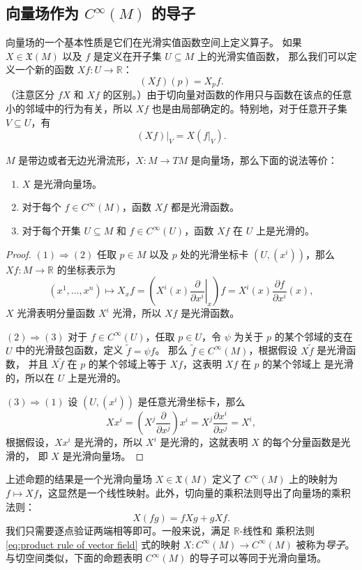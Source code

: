 \documentclass[fontset=none]{Notes}
\begin{document}
\subsection{向量场作为 $C^\infty(M)$ 的导子}

向量场的一个基本性质是它们在光滑实值函数空间上定义算子。
如果 $X\in \mathfrak X(M)$ 以及 $f$ 是定义在开子集 $U\subseteq M$ 上的光滑实值函数，
那么我们可以定义一个新的函数 $Xf:U\to \mathbb{R}$：
\[
  (Xf)(p)=X_pf.
\]
（注意区分 $fX$ 和 $Xf$ 的区别。）由于切向量对函数的作用只与函数在该点的任意小的邻域中的行为有关，所以
$Xf$ 也是由局部确定的。特别地，对于任意开子集 $V\subseteq U$，有
\[
  (Xf)|_V=X(f|_V).
\]

\begin{proposition}
  $M$ 是带边或者无边光滑流形，$X:M\to TM$ 是向量场，那么下面的说法等价：
  \begin{enumerate}
    \item $X$ 是光滑向量场。
    \item 对于每个 $f\in C^\infty(M)$，函数 $Xf$ 都是光滑函数。
    \item 对于每个开集 $U\subseteq M$ 和 $f\in C^\infty(U)$，函数 $Xf$ 在 $U$ 上是光滑的。
  \end{enumerate}
\end{proposition}
\begin{proof}
  $(1)\Rightarrow (2)$ 任取 $p\in M$ 以及 $p$ 处的光滑坐标卡 $(U,(x^i))$，那么 
  $Xf:M\to \mathbb{R}$ 的坐标表示为
  \[
    \left(x^1,\dots,x^n \right)\mapsto 
    X_x f=\left(X^i(x)\left.\frac{\partial}{\partial x^i}\right|_x\right)f=
    X^i(x)\frac{\partial f}{\partial x^i}(x),
  \]
  $X$ 光滑表明分量函数 $X^i$ 光滑，所以 $Xf$ 是光滑函数。

  $(2)\Rightarrow (3)$ 对于 $f\in C^\infty(U)$，任取 $p\in U$，令 $\psi$
  为关于 $p$ 的某个邻域的支在 $U$ 中的光滑鼓包函数，定义 $\tilde f=\psi f$。
  那么 $\tilde f\in C^\infty(M)$，根据假设 $X\tilde f$ 是光滑函数，
  并且 $X\tilde f$ 在 $p$ 的某个邻域上等于 $Xf$，这表明 $Xf$ 在 $p$ 的某个邻域上
  是光滑的，所以在 $U$ 上是光滑的。

  $(3)\Rightarrow (1)$ 设 $(U,(x^i))$ 是任意光滑坐标卡，那么
  \[
    Xx^i=\left(X^j\frac{\partial }{\partial x^j}\right)x^i
    =X^j\frac{\partial x^i}{\partial x^j}=X^i,
  \]
  根据假设，$Xx^i$ 是光滑的，所以 $X^i$ 是光滑的，这就表明 $X$ 的每个分量函数是光滑的，
  即 $X$ 是光滑向量场。
\end{proof}

上述命题的结果是一个光滑向量场 $X\in \mathfrak X(M)$ 定义了 $C^\infty(M)$
上的映射为 $f\mapsto Xf$，这显然是一个线性映射。此外，切向量的乘积法则导出了向量场的乘积法则：
\begin{equation}\label{eq:product rule of vector field}
  X(fg)=fXg+gXf.
\end{equation}
我们只需要逐点验证两端相等即可。一般来说，满足 $\mathbb{R}$-线性和
乘积法则 \eqref{eq:product rule of vector field} 式的映射 $X:C^\infty(M)\to C^\infty(M)$
被称为\emph{导子}。与切空间类似，下面的命题表明 $C^\infty(M)$ 的导子可以等同于光滑向量场。
\end{document}
